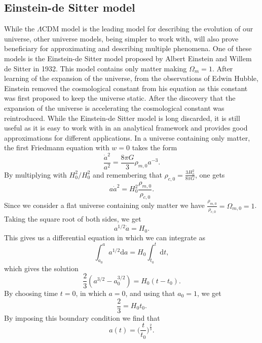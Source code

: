 \subsection{Einstein-de Sitter model}
While the $\Lambda$CDM model is the leading model for describing the evolution
of our universe, other universe models, being simpler to work with, will also
prove beneficiary for approximating and describing multiple phenomena. One of
these models is the Einstein-de Sitter model \cite{1932PNAS...18..213E} proposed
by Albert Einstein and Willem de Sitter in 1932. This model contains only matter
making $\Omega_m=1$. After learning of the expansion
of the universe, from the observations of Edwin Hubble, Einstein removed the
cosmological constant from his equation as this constant was first proposed to keep the
universe static. After the discovery that the expansion of the universe is
accelerating \cite{Goldhaber_2009}\cite{Filippenko_1998} the cosmological
constant was reintroduced. While the Einstein-de Sitter model is long discarded, it is
still useful as it is easy to work with in an analytical framework and provides
good approximations for different applications. In a universe containing only
matter, the first Friedmann equation with $w=0$ takes the form
\begin{equation}
    \frac{\dot{a}^2}{a^2} = \frac{8\pi G}{3}\rho_{m,0}a^{-3}.
\end{equation}
By multiplying with $H_0^2/H_0^2$ and remembering that $\rho_{c,0}=\frac{3H_0^2}{8\pi
G}$, one gets
\begin{equation}
    a\dot{a}^2=H_0^2\frac{\rho_{m,0}}{\rho_{c,0}}.
\end{equation}
Since we consider a flat universe containing only matter we have
$\frac{\rho_{m,0}}{\rho_{c,0}}=\Omega_{m,0}=1$. Taking the square root of both
sides, we get
\begin{equation}
    a^{1/2}\dot{a}=H_0.
\end{equation}
This gives us a differential equation in which we can integrate as
\begin{equation}
    \int_{a_0}^a a^{1/2}\mathrm{d}a=H_0\int_{t_0}^t \mathrm{d}t,
\end{equation}
which gives the solution
\begin{equation}
    \frac{2}{3}(a^{3/2}-a_0^{3/2})=H_0(t-t_0).
\end{equation}
By choosing time $t=0$, in which $a=0$, and using that $a_0=1$, we get
\begin{equation}
    \frac{2}{3}=H_0t_0.
\end{equation}
By imposing this boundary condition we find that
\begin{equation}
    a(t)=\Big(\frac{t}{t_0}\Big)^\frac{2}{3}.
\end{equation}

